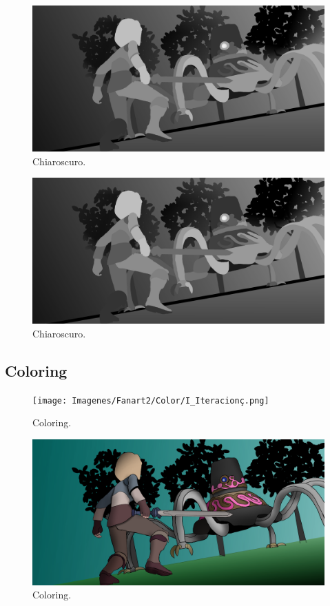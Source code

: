 \documentclass{cup-pan}
\begin{document}
        \begin{figure}[H]
            \includegraphics[width=\textwidth]{Imagenes/Fanart2/Claroscuro/IIII_Iteracion.png}
            \caption{Chiaroscuro.}
        \end{figure}

        \begin{figure}[H]
            \includegraphics[width=\textwidth]{Imagenes/Fanart2/Claroscuro/IIIII_Iteracion.png}
            \caption{Chiaroscuro.}
        \end{figure}

    \subsection{Coloring}

        \begin{figure}[H]
            \texttt{[image: Imagenes/Fanart2/Color/I\_Iteracionç.png]}
            \caption{Coloring.}
        \end{figure}

        \begin{figure}[H]
            \includegraphics[width=\textwidth]{Imagenes/Fanart2/Color/II_Iteracion.png}
            \caption{Coloring.}
        \end{figure}
\end{document}
